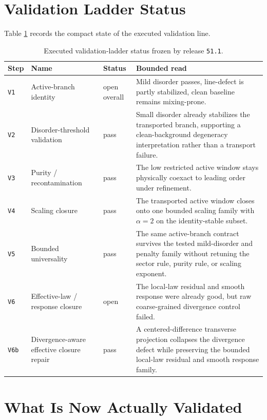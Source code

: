 \documentclass[11pt]{article}
\begin{document}
\section{Validation Ladder Status}

Table \ref{tab:validation_status} records the compact state of the executed validation line.

\begin{table}[h!]
\centering
\begin{tabular}{@{}p{1.0cm}p{3.2cm}p{1.8cm}p{7.0cm}@{}}
\toprule
Step & Name & Status & Bounded read \\
\midrule
\texttt{V1} & Active-branch identity & open overall & Mild disorder passes, line-defect is partly stabilized, clean baseline remains mixing-prone. \\
\texttt{V2} & Disorder-threshold validation & pass & Small disorder already stabilizes the transported branch, supporting a clean-background degeneracy interpretation rather than a transport failure. \\
\texttt{V3} & Purity / recontamination & pass & The low restricted active window stays physically coexact to leading order under refinement. \\
\texttt{V4} & Scaling closure & pass & The transported active window closes onto one bounded scaling family with \(\alpha = 2\) on the identity-stable subset. \\
\texttt{V5} & Bounded universality & pass & The same active-branch contract survives the tested mild-disorder and penalty family without retuning the sector rule, purity rule, or scaling exponent. \\
\texttt{V6} & Effective-law / response closure & open & The local-law residual and smooth response were already good, but raw coarse-grained divergence control failed. \\
\texttt{V6b} & Divergence-aware effective closure repair & pass & A centered-difference transverse projection collapses the divergence defect while preserving the bounded local-law residual and smooth response family. \\
\bottomrule
\end{tabular}
\caption{Executed validation-ladder status frozen by release \texttt{51.1}.}
\label{tab:validation_status}
\end{table}

\section{What Is Now Actually Validated}
\end{document}
